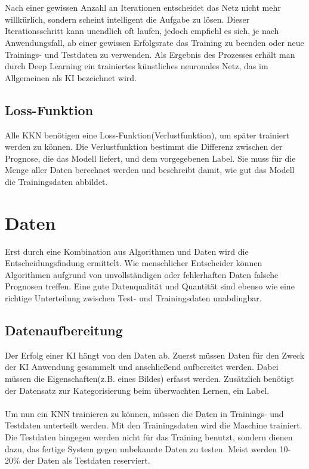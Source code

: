 \documentclass[12pt,oneside,a4paper,parskip]{scrbook}
\begin{document}
\\\\
Nach einer gewissen Anzahl an Iterationen entscheidet das Netz nicht mehr willkürlich, sondern scheint intelligent die Aufgabe zu lösen. Dieser Iterationsschritt kann unendlich oft laufen, jedoch empfiehl es sich, je nach Anwendungsfall, ab einer gewissen Erfolgsrate das Training zu beenden oder neue Trainings- und Testdaten zu verwenden. Als Ergebnis des Prozesses erhält man durch Deep Learning ein trainiertes künstliches neuronales Netz, das im Allgemeinen als KI bezeichnet wird.
\subsection{Loss-Funktion}
\label{section:lossFunction}
Alle KKN benötigen eine Loss-Funktion(Verlustfunktion), um später trainiert werden zu können. Die Verlustfunktion bestimmt die Differenz zwischen der Prognose, die das Modell liefert, und dem vorgegebenen Label. Sie muss für die Menge aller Daten berechnet werden und beschreibt damit, wie gut das Modell die Trainingsdaten abbildet.

\section{Daten}
\label{section:Data}
Erst durch eine Kombination aus Algorithmen und Daten wird die Entscheidungsfindung ermittelt. Wie menschlicher Entscheider können Algorithmen aufgrund von unvollständigen oder fehlerhaften Daten falsche Prognosen treffen. Eine gute Datenqualität und Quantität sind ebenso wie eine richtige Unterteilung zwischen Test- und Trainingsdaten unabdingbar.

\subsection{Datenaufbereitung}
\label{section:dataSetup}
Der Erfolg einer KI hängt von den Daten ab. Zuerst müssen Daten für den Zweck der KI Anwendung gesammelt und anschließend aufbereitet werden. Dabei müssen die Eigenschaften(z.B. eines Bildes) erfasst werden. Zusätzlich benötigt der Datensatz zur Kategorisierung beim überwachten Lernen, ein Label.
\\\\
Um nun ein KNN trainieren zu können, müssen die Daten in Trainings- und Testdaten unterteilt werden. Mit den Trainingsdaten wird die Maschine trainiert. Die Testdaten hingegen werden nicht für das Training benutzt, sondern dienen dazu, das fertige System gegen unbekannte Daten zu testen. Meist werden 10-20\% der Daten als Testdaten reserviert.
\end{document}
